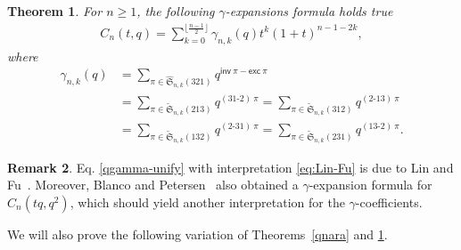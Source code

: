 \documentclass[12pt,reqno]{amsart}
\numberwithin{equation}{section}
\theoremstyle{plain}
\newtheorem{theorem}{Theorem}[section]
\theoremstyle{definition}
\newtheorem{remark}[theorem]{Remark}
\def\S{\mathfrak{S}}
\def\exc{\mathsf{exc}}
\def\ai{\mathsf{adi}}
\def\des{\mathsf{des}}
\def\inv{\mathsf{inv}}
\def\cab{31\text{-}2}
\def\bca{2\text{-}31}
\def\acb{13\text{-}2}
\def\bac{2\text{-}13}
\begin{document}
\begin{theorem}\label{thm:des-ai-qgamma}
For  $n\geq1$, the following $\gamma$-expansions formula holds true
\begin{align}\label{qgamma-unify}
C_n(t,q)=\sum_{k=0}^{\lfloor \frac{n-1}{2}\rfloor}
\gamma_{n,k}(q)t^k(1+t)^{n-1-2k},
\end{align}
where
\begin{align}
\gamma_{n,k}(q)&=\sum_{\pi\in\widehat{\S}_{n,k}(321)}q^{\inv\:\pi-\exc\:\pi}\label{eq:Lin-Fu}\\
&=\sum_{\pi\in\widetilde{\S}_{n,k}(213)}q^{(\cab)\:\pi}
=\sum_{\pi\in\widetilde{\S}_{n,k}(312)}q^{(\bac)\:\pi}\label{eq:213:312}\\
&=\sum_{\pi\in\widetilde{\S}_{n,k}(132)}q^{(\bca)\:\pi}
=\sum_{\pi\in\widetilde{\S}_{n,k}(231)}q^{(\acb)\:\pi}\label{eq:231:132}.
\end{align}
\end{theorem}
\begin{remark}
Eq. \eqref{qgamma-unify} with interpretation \eqref{eq:Lin-Fu} is due to Lin and Fu~\cite{LF17}. Moreover, Blanco and Petersen~\cite{BP14} also obtained a $\gamma$-expansion formula for $C_n(tq,q^2)$, which should yield another interpretation for the $\gamma$-coefficients.
\end{remark}
We will also prove the following variation of Theorems~\ref{qnara} and \ref{thm:des-ai-qgamma}.
\end{document}
